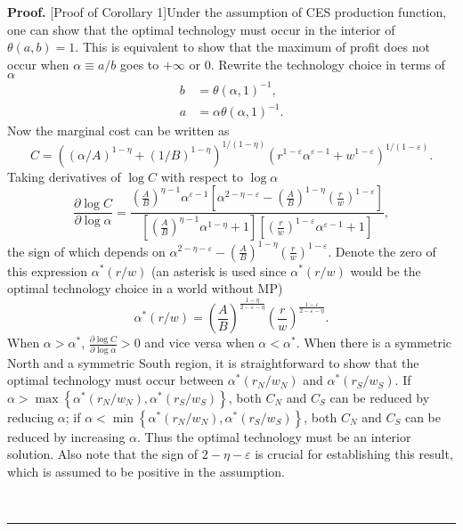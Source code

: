 \documentclass[notitlepage,11pt]{article}%
\newenvironment{proof}[1][Proof]{\noindent \textbf{#1.} }{\  \rule{0.5em}{0.5em}}
\begin{document}
\begin{proof}
[Proof of Corollary 1]Under the assumption of CES production function, one can
show that the optimal technology must occur in the interior of $\theta\left(
a,b\right)  =1$. This is equivalent to show that the maximum of profit does
not occur when $\alpha\equiv a/b$ goes to $+\infty$ or $0$. Rewrite the
technology choice in terms of $\alpha$%
\begin{align*}
b  &  =\theta\left(  \alpha,1\right)  ^{-1},\\
a  &  =\alpha\theta\left(  \alpha,1\right)  ^{-1}.
\end{align*}
Now the marginal cost can be written as%
\[
C=\left(  \left(  \alpha/A\right)  ^{1-\eta}+\left(  1/B\right)  ^{1-\eta
}\right)  ^{1/\left(  1-\eta\right)  }\left(  r^{1-\varepsilon}\alpha
^{\varepsilon-1}+w^{1-\varepsilon}\right)  ^{1/\left(  1-\varepsilon\right)
}.
\]
Taking derivatives of $\log C$ with respect to $\log\alpha$%
\[
\frac{\partial\log C}{\partial\log\alpha}=\frac{\left(  \frac{A}{B}\right)
^{\eta-1}\alpha^{\varepsilon-1}\left[  \alpha^{2-\eta-\varepsilon}-\left(
\frac{A}{B}\right)  ^{1-\eta}\left(  \frac{r}{w}\right)  ^{1-\varepsilon
}\right]  }{\left[  \left(  \frac{A}{B}\right)  ^{\eta-1}\alpha^{1-\eta
}+1\right]  \left[  \left(  \frac{r}{w}\right)  ^{1-\varepsilon}%
\alpha^{\varepsilon-1}+1\right]  },
\]
the sign of which depends on $\alpha^{2-\eta-\varepsilon}-\left(  \frac{A}%
{B}\right)  ^{1-\eta}\left(  \frac{r}{w}\right)  ^{1-\varepsilon}$. Denote the
zero of this expression $\alpha^{\ast}\left(  r/w\right)  $ (an asterisk is
used since $\alpha^{\ast}\left(  r/w\right)  $ would be the optimal technology
choice in a world without MP)%
\[
\alpha^{\ast}\left(  r/w\right)  =\left(  \frac{A}{B}\right)  ^{\frac{1-\eta
}{2-\varepsilon-\eta}}\left(  \frac{r}{w}\right)  ^{\frac{1-\varepsilon
}{2-\varepsilon-\eta}}.
\]
When $\alpha>\alpha^{\ast}$, $\frac{\partial\log C}{\partial\log\alpha}>0$ and
vice versa when $\alpha<\alpha^{\ast}$. When there is a symmetric North and a
symmetric South region, it is straightforward to show that the optimal
technology must occur between $\alpha^{\ast}\left(  r_{N}/w_{N}\right)  $ and
$\alpha^{\ast}\left(  r_{S}/w_{S}\right)  $. If $\alpha>\max\left\{
\alpha^{\ast}\left(  r_{N}/w_{N}\right)  ,\alpha^{\ast}\left(  r_{S}%
/w_{S}\right)  \right\}  $, both $C_{N}$ and $C_{S}$ can be reduced by
reducing $\alpha$; if $\alpha<\min\left\{  \alpha^{\ast}\left(  r_{N}%
/w_{N}\right)  ,\alpha^{\ast}\left(  r_{S}/w_{S}\right)  \right\}  $, both
$C_{N}$ and $C_{S}$ can be reduced by increasing $\alpha$. Thus the optimal
technology must be an interior solution. Also note that the sign of
$2-\eta-\varepsilon$ is crucial for establishing this result, which is assumed
to be positive in the assumption.


\end{proof}
\end{document}
